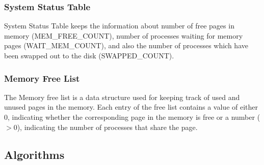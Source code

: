 \documentclass[11pt ,twosided]{article}
\begin{document}
\subsubsection{System Status Table}

System Status Table keeps the information about number of free pages in memory (MEM\_FREE\_COUNT), number of processes waiting for memory pages (WAIT\_MEM\_COUNT), and also the number of processes which have been swapped out to the disk (SWAPPED\_COUNT).
\subsubsection{Memory Free List}

The Memory free list is a data structure used for keeping track of used and unused pages in the memory. Each entry of the free list contains a value of either 0, indicating whether the corresponding page in the memory is free or a number ($>$0), indicating the number of processes that share the page.
\subsection{Algorithms}
\end{document}
